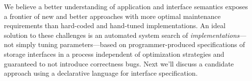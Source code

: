 We believe a better understanding of application and interface semantics
exposes a frontier of new and better approaches with more optimal maintenance
requirements than hard-coded and hand-tuned implementations. An ideal solution
to these challenges is an automated system search of
\emph{implementations}---not simply tuning parameters---based on
programmer-produced specifications of storage interfaces in a process
independent of optimization strategies and guaranteed to not introduce
correctness bugs. Next we'll discuss a candidate approach using a declarative
language for interface specification.
